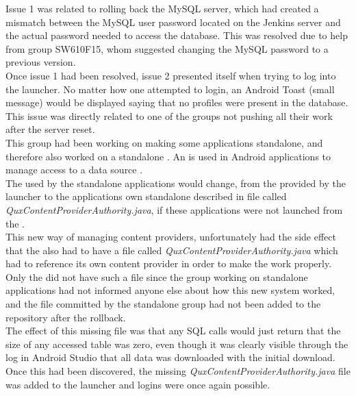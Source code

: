 Issue 1 was related to rolling back the MySQL server, which had created a mismatch between the MySQL user password located on the Jenkins server and the actual password needed to access the database. This was resolved due to help from group SW610F15, whom suggested changing the MySQL password to a previous version. \\

Once issue 1 had been resolved, issue 2 presented itself when trying to log into the \giraf launcher. No matter how one attempted to login, an Android Toast (small message) would be displayed saying that no profiles were present in the database. This issue was directly related to one of the groups not pushing all their work after the server reset. \\

This group had been working on making some applications standalone, and therefore also worked on a standalone . An  is used in Android applications to manage access to a data source \parencite{android_content_provider}. \\

The  used by the standalone applications would change, from the  provided by the launcher to the applications own standalone  described in file called \emph{QuxContentProviderAuthority.java}, if these applications were not launched from the \giraf \launcher. \\

This new way of managing content providers, unfortunately had the side effect that the \giraf \launcher also had to have a file called \emph{QuxContentProviderAuthority.java} which had to reference its own content provider in order to make the \giraf \launcher work properly. Only the \giraf \launcher did not have such a file since the group working on standalone applications had not informed anyone else about how this new system worked, and the file committed by the standalone group had not been added to the \giraf \launcher repository after the rollback. \\

The effect of this missing file was that any SQL calls would just return that the size of any accessed table was zero, even though it was clearly visible through the log in Android Studio that all data was downloaded with the initial download. Once this had been discovered, the missing \emph{QuxContentProviderAuthority.java} file was added to the launcher and logins were once again possible. \\


